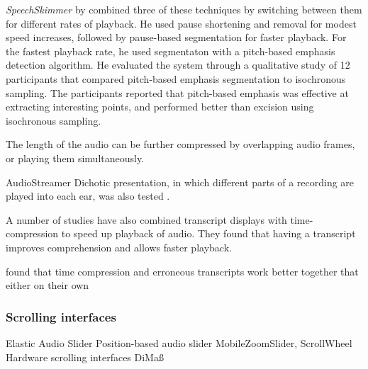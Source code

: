 \textit{SpeechSkimmer} by \citep{Arons1997} combined three of these techniques by switching between them for different
rates of playback. He used pause shortening and removal for modest speed increases, followed by pause-based
segmentation for faster playback. For the fastest playback rate, he used segmentaton with a pitch-based emphasis
detection algorithm. He evaluated the system through a qualitative study of 12 participants that compared pitch-based
emphasis segmentation to isochronous sampling. The participants reported that pitch-based emphasis was effective at
extracting interesting points, and performed better than excision using isochronous sampling.

The length of the audio can be further compressed by overlapping audio frames, or playing them simultaneously.

AudioStreamer \citep{Schmandt1995}
Dichotic presentation, in which different parts of a recording are played into
each ear, was also tested \citep{Ranjan2006}.


A number of studies \citep{Whittaker2002,Vemuri2004,Ranjan2006} have also
combined transcript displays with time-compression to speed up playback of audio. They found that having a transcript
improves comprehension and allows
faster playback.





\citet{Vemuri2004} found that time compression and erroneous transcripts work better together that either on their own


\subsubsection{Scrolling interfaces}
Elastic Audio Slider \citep{Hurst2004}
Position-based audio slider \citep{Hurst2006}
MobileZoomSlider, ScrollWheel \citep{Huerst2008}
Hardware scrolling interfaces \citep{Lee2007}
DiMa\ss \citep{Lee2006}

